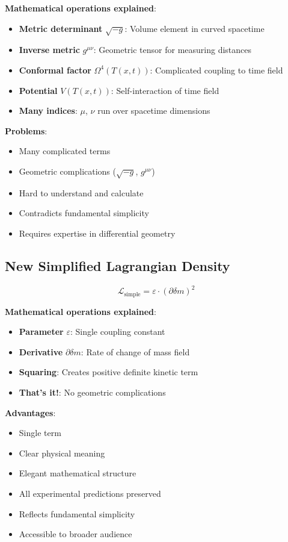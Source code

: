 \documentclass[12pt,a4paper]{article}
\newcommand{\Tfield}{T(x,t)}
\newcommand{\deltam}{\delta m}
\newcommand{\Lag}{\mathcal{L}}
\theoremstyle{definition}
\theoremstyle{remark}
\begin{document}
	\textbf{Mathematical operations explained}:
	\begin{itemize}
		\item \textbf{Metric determinant} $\sqrt{-g}$: Volume element in curved spacetime
		\item \textbf{Inverse metric} $g^{\mu\nu}$: Geometric tensor for measuring distances
		\item \textbf{Conformal factor} $\Omega^4(\Tfield)$: Complicated coupling to time field
		\item \textbf{Potential} $V(\Tfield)$: Self-interaction of time field
		\item \textbf{Many indices}: $\mu$, $\nu$ run over spacetime dimensions
	\end{itemize}
	
	\textbf{Problems}:
	\begin{itemize}
		\item Many complicated terms
		\item Geometric complications ($\sqrt{-g}$, $g^{\mu\nu}$)
		\item Hard to understand and calculate
		\item Contradicts fundamental simplicity
		\item Requires expertise in differential geometry
	\end{itemize}
	
	\subsection{New Simplified Lagrangian Density}
	
	\begin{equation}
		\boxed{\Lag_{\text{simple}} = \varepsilon \cdot (\partial \deltam)^2}
	\end{equation}
	
	\textbf{Mathematical operations explained}:
	\begin{itemize}
		\item \textbf{Parameter} $\varepsilon$: Single coupling constant
		\item \textbf{Derivative} $\partial \deltam$: Rate of change of mass field
		\item \textbf{Squaring}: Creates positive definite kinetic term
		\item \textbf{That's it!}: No geometric complications
	\end{itemize}
	
	\textbf{Advantages}:
	\begin{itemize}
		\item Single term
		\item Clear physical meaning
		\item Elegant mathematical structure
		\item All experimental predictions preserved
		\item Reflects fundamental simplicity
		\item Accessible to broader audience
	\end{itemize}
	
\end{document}
